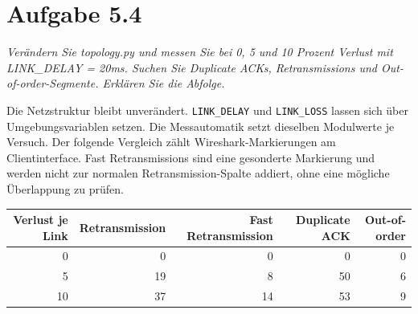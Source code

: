 \documentclass[a4paper,11pt]{article}
\newcommand{\aufgabe}[1]{\section*{Aufgabe #1}}
\newcommand{\angabe}[1]{\textit{#1}\par\smallskip}
\begin{document}
\aufgabe{5.4}
\angabe{Verändern Sie topology.py und messen Sie bei 0, 5 und 10 Prozent Verlust mit LINK\_DELAY = 20ms. Suchen Sie Duplicate ACKs, Retransmissions und Out-of-order-Segmente. Erklären Sie die Abfolge.}

Die Netzstruktur bleibt unverändert. \texttt{LINK\_DELAY} und
\texttt{LINK\_LOSS} lassen sich über Umgebungsvariablen setzen.
Die Messautomatik setzt dieselben Modulwerte je Versuch.
Der folgende Vergleich zählt Wireshark-Markierungen am Clientinterface.
Fast Retransmissions sind eine gesonderte Markierung und werden nicht zur
normalen Retransmission-Spalte addiert, ohne eine mögliche Überlappung zu prüfen.
\begin{center}\begin{tabular}{rrrrr}\toprule
Verlust je Link & Retransmission & Fast Retransmission & Duplicate ACK & Out-of-order\\\midrule
0 & 0 & 0 & 0 & 0\\
5 & 19 & 8 & 50 & 6\\
10 & 37 & 14 & 53 & 9\\
\bottomrule\end{tabular}\end{center}
\end{document}
